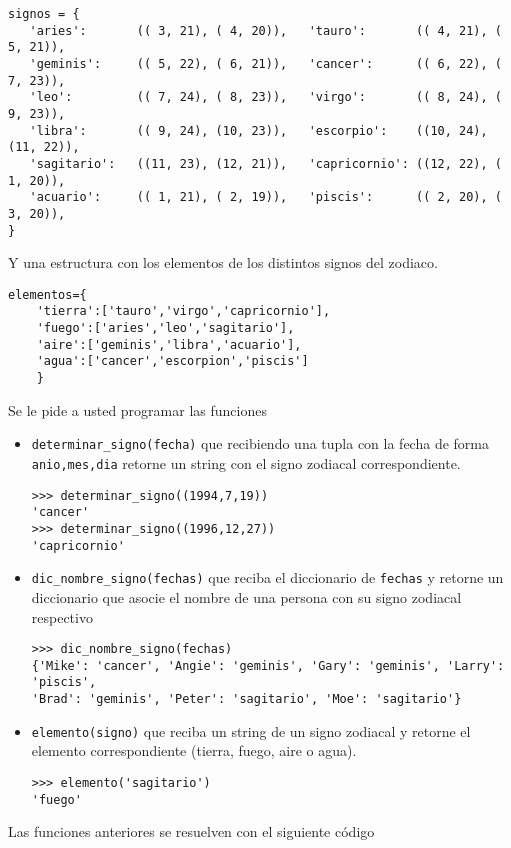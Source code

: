 \documentclass[spanish, fleqn]{scrartcl}
\begin{document}
\begin{lstlisting}[style=consola]
signos = {
   'aries':       (( 3, 21), ( 4, 20)),   'tauro':       (( 4, 21), ( 5, 21)),
   'geminis':     (( 5, 22), ( 6, 21)),   'cancer':      (( 6, 22), ( 7, 23)),
   'leo':         (( 7, 24), ( 8, 23)),   'virgo':       (( 8, 24), ( 9, 23)),
   'libra':       (( 9, 24), (10, 23)),   'escorpio':    ((10, 24), (11, 22)),
   'sagitario':   ((11, 23), (12, 21)),   'capricornio': ((12, 22), ( 1, 20)),
   'acuario':     (( 1, 21), ( 2, 19)),   'piscis':      (( 2, 20), ( 3, 20)),
}
\end{lstlisting}
Y una estructura con los elementos de los distintos signos del zodiaco.
\begin{lstlisting}[style=consola]
elementos={
    'tierra':['tauro','virgo','capricornio'],
    'fuego':['aries','leo','sagitario'],
    'aire':['geminis','libra','acuario'],
    'agua':['cancer','escorpion','piscis']
    }
\end{lstlisting}
Se le pide a usted programar las funciones
\begin{itemize}
    \item \texttt{determinar\_signo(fecha)} que recibiendo una tupla con la fecha de forma \texttt{anio,mes,dia} retorne un string con el signo zodiacal correspondiente.
\begin{lstlisting}[style=consola]
>>> determinar_signo((1994,7,19))
'cancer'
>>> determinar_signo((1996,12,27))
'capricornio'
\end{lstlisting}
    \item \texttt{dic\_nombre\_signo(fechas)} que reciba el diccionario de \texttt{fechas} y retorne un diccionario que asocie el nombre de una persona con su signo zodiacal respectivo
\begin{lstlisting}[style=consola]
>>> dic_nombre_signo(fechas)
{'Mike': 'cancer', 'Angie': 'geminis', 'Gary': 'geminis', 'Larry': 'piscis', 
'Brad': 'geminis', 'Peter': 'sagitario', 'Moe': 'sagitario'}
\end{lstlisting}
\newpage
    \item \texttt{elemento(signo)} que reciba un string de un signo zodiacal y retorne el elemento correspondiente (tierra, fuego, aire o agua).
\begin{lstlisting}[style=consola]
>>> elemento('sagitario')
'fuego'
\end{lstlisting}
\end{itemize}

Las funciones anteriores se resuelven con el siguiente código 
\end{document}
